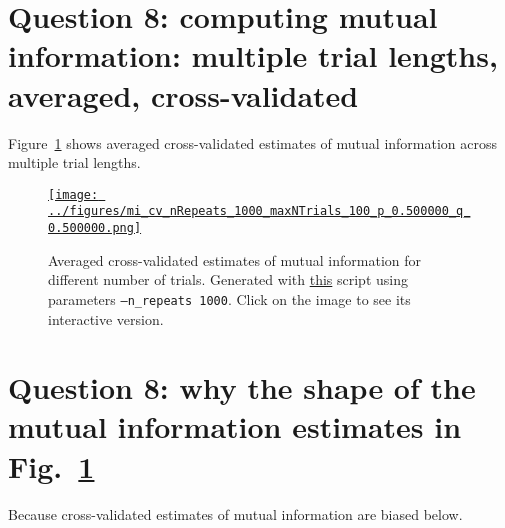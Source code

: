 \documentclass[12pt]{article}
\begin{document}
\section*{Question 8: computing mutual information: multiple trial lengths, averaged, cross-validated}

Figure~\ref{fig:miEstimatesCVMultiTrialAveraged} shows averaged cross-validated estimates of
mutual information across multiple trial lengths.

\begin{figure}[H]
    \begin{center}
        \href{https://www.gatsby.ucl.ac.uk/~rapela/neuroinformatics/2023/ws8/figures/mi_cv_nRepeats_1000_maxNTrials_100_p_0.500000_q_0.500000.html}{\texttt{[image: ../figures/mi\_cv\_nRepeats\_1000\_maxNTrials\_100\_p\_0.500000\_q\_0.500000.png]}}

        \caption{Averaged cross-validated estimates of mutual information for different number of trials.
        Generated with
        \href{https://github.com/joacorapela/neuroinformatics23/blob/master/worksheets/ws8/mySolution/code/scripts/doEstimateMI_cv_multiTrials.py}{this}
        script using parameters \texttt{--n\_repeats 1000}. Click on the image to see its
        interactive version.}

        \label{fig:miEstimatesCVMultiTrialAveraged}
    \end{center}
\end{figure}

\section*{Question 8: why the shape of the mutual information estimates in Fig.~\ref{fig:miEstimatesCVMultiTrialAveraged}}

Because cross-validated estimates of mutual information are biased below.
\end{document}

